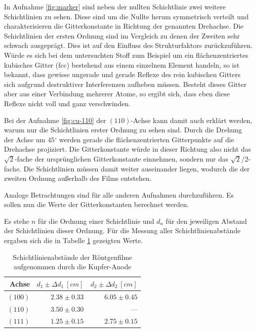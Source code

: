 	In Aufnahme \ref{fig:marker} sind neben der nullten Schichtlinie zwei weitere Schichtlinien zu sehen.
	Diese sind um die Nullte herum symmetrisch verteilt und charakterisieren die Gitterkonstante in Richtung der genannten Drehachse.
	Die Schichtlinien der ersten Ordnung sind im Vergleich zu denen der Zweiten sehr schwach ausgeprägt.
	Dies ist auf den Einfluss des Strukturfaktors zurückzuführen.
	Würde es sich bei dem untersuchten Stoff zum Beispiel um ein flächenzentriertes kubisches Gitter (fcc) bestehend aus einem einzelnem Element handeln, so ist bekannt, dass gewisse ungerade und gerade Reflexe des rein kubischen Gitters sich aufgrund destruktiver Interferenzen aufheben müssen.
	Besteht dieses Gitter aber aus einer Verbindung mehrerer Atome, so ergibt sich, dass eben diese Reflexe nicht voll und ganz verschwinden.

	Bei der Aufnahme \ref{fig:cu-110} der $(110)$-Achse kann damit auch erklärt werden, warum nur die Schichtlinien erster Ordnung zu sehen sind.
	Durch die Drehung der Achse um $45\unit{^\circ}$ werden gerade die flächenzentrierten Gitterpunkte auf die Drehachse projiziert.
	Die Gitterkonstante würde in dieser Richtung also nicht das $\sqrt{2}$-fache der ursprünglichen Gitterkonstante einnehmen, sondern nur das $\sqrt{2}/2$-fache.
	Die Schichtlinien müssen damit weiter auseinander liegen, wodurch die der zweiten Ordnung außerhalb des Films entstehen. 

	Analoge Betrachtungen sind für alle anderen Aufnahmen durchzuführen.
	Es sollen nun die Werte der Gitterkonstanten berechnet werden.

	Es stehe $n$ für die Ordnung einer Schichtlinie und $d_n$ für den jeweiligen Abstand der Schichtlinien dieser Ordnung.
	Für die Messung aller Schichtlinienabstände ergaben sich die in Tabelle \ref{tab:achse-d} gezeigten Werte.
	\begin{table}[H]
		\centering
		\begin{tabular}{r||r|r}
			Achse & $d_1\pm\Delta d_1\ [\unit{cm}]$ & $d_2\pm\Delta d_2\ [\unit{cm}]$ \\
			\hline
			\hline
			$(100)$ & $2.38\pm 0.33$ & $6.05\pm 0.45$ \\
			$(110)$ & $3.50\pm 0.30$ & --- \\
			$(111)$ & $1.25\pm 0.15$ & $2.75\pm 0.15$
		\end{tabular}
		\caption{Schichtlinienabstände der Röntgenfilme aufgenommen durch die Kupfer-Anode}
		\label{tab:achse-d}
	\end{table}

